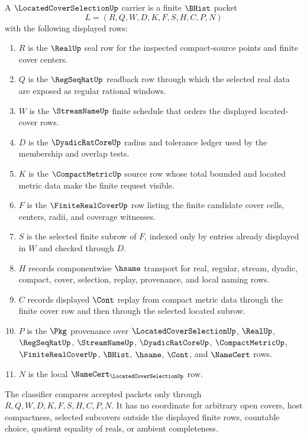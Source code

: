 \begin{definition}
\label{def:located-cover-selection-carrier}
A $\LocatedCoverSelectionUp$ carrier is a finite $\BHist$ packet
$$
L=(R,Q,W,D,K,F,S,H,C,P,N)
$$
with the following displayed rows:
\begin{enumerate}
\item $R$ is the $\RealUp$ seal row for the inspected compact-source points and finite cover centers.
\item $Q$ is the $\RegSeqRatUp$ readback row through which the selected real data are exposed as regular rational windows.
\item $W$ is the $\StreamNameUp$ finite schedule that orders the displayed located-cover rows.
\item $D$ is the $\DyadicRatCoreUp$ radius and tolerance ledger used by the membership and overlap tests.
\item $K$ is the $\CompactMetricUp$ source row whose total bounded and located metric data make the finite request visible.
\item $F$ is the $\FiniteRealCoverUp$ row listing the finite candidate cover cells, centers, radii, and coverage witnesses.
\item $S$ is the selected finite subrow of $F$, indexed only by entries already displayed in $W$ and checked through $D$.
\item $H$ records componentwise $\hsame$ transport for real, regular, stream, dyadic, compact, cover, selection, replay, provenance, and local naming rows.
\item $C$ records displayed $\Cont$ replay from compact metric data through the finite cover row and then through the selected located subrow.
\item $P$ is the $\Pkg$ provenance over $\LocatedCoverSelectionUp$, $\RealUp$, $\RegSeqRatUp$, $\StreamNameUp$, $\DyadicRatCoreUp$, $\CompactMetricUp$, $\FiniteRealCoverUp$, $\BHist$, $\hsame$, $\Cont$, and $\NameCert$ rows.
\item $N$ is the local $\NameCert_{\LocatedCoverSelectionUp}$ row.
\end{enumerate}
The classifier compares accepted packets only through $R,Q,W,D,K,F,S,H,C,P,N$. It has no coordinate for arbitrary open covers, host compactness, selected subcovers outside the displayed finite rows, countable choice, quotient equality of reals, or ambient completeness.
\end{definition}

